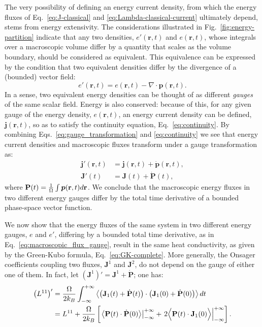 The very possibility of defining an energy current density, from which the energy fluxes of Eq.~\eqref{eq:J-classical} and \eqref{eq:Lambda-classical-current} ultimately depend, stems from energy extensivity. The considerations illustrated in Fig.~\ref{fig:energy-partition} indicate that any two densities, $e'(\mathbf{r},t)$ and $e(\mathbf{r},t)$, whose integrals over a macroscopic volume differ by a quantity that scales as the volume boundary, should be considered as equivalent. This equivalence can be expressed by the condition that two equivalent densities differ by the divergence of a (bounded) vector field:
\begin{equation}
  e'(\mathbf{r},t)=e(\mathbf{r},t) - \nabla\cdot \bm{p}(\mathbf{r},t). \label{eq:gauge_transformation}
\end{equation}
In a sense, two equivalent energy densities can be thought of as different \emph{gauges} of the same scalar field. Energy is also conserved: because of this, for any given gauge of the energy density, $e(\mathbf{r},t)$, an energy current density can be defined, $\bm{j}(\mathbf{r},t)$, so as to satisfy the continuity equation, Eq.~\eqref{eq:continuity}. By combining Eqs.~\eqref{eq:gauge_transformation} and \eqref{eq:continuity} we see that energy current densities and macroscopic fluxes transform under a gauge transformation as:
\begin{align}
 \bm{j}'(\mathbf{r},t) & = \bm{j}(\mathbf{r},t) + \dot{\bm{p}}(\mathbf{r},t), \label{eq:current_density_gauge} \\
  \mathbf{J}'(t) & = \mathbf{J}(t) + \dot{\mathbf{P}}(t), \label{eq:macroscopic_flux_gauge}
\end{align}
where $\mathbf{P}(t)=\frac{1}{{\mathrm\Omega}} \int\bm{p}(\mathbf{r},t)d\mathbf{r}$. We
conclude that the macroscopic energy fluxes in two different energy gauges differ by the total time derivative of a bounded phase-space vector function.

We now show that the energy fluxes of the same system in two different energy gauges, $e$ and $e'$, differing by a bounded total time derivative, as in Eq.~\eqref{eq:macroscopic_flux_gauge}, result in the same heat conductivity, as given by the Green-Kubo formula, Eq.~\eqref{eq:GK-complete}. More generally, the Onsager coefficients coupling two fluxes, $\mathbf{J}^1$ and $\mathbf{J}^2$, do not depend on the gauge of either one of them. In fact, let $\left(\mathbf{J}^1\right)' = \mathbf{J}^1 + \dot{\mathbf{P}}$; one has:
\begin{equation}
  \begin{aligned}
    \left (L^{11} \right)' &= \frac{\rOmega}{2 k_B }\int_{-\infty}^{+\infty} \left \langle \left (\mathbf{J}_1(t)+\dot{\mathbf{P}}(t) \right ) \cdot  \left (\mathbf{J}_1(0)+\dot{\mathbf{P}}(0)\right ) \right \rangle dt \\
    &= L^{11} + \frac{\rOmega}{2 k_B } \left[ \left .  \left \langle \mathbf{P}(t) \cdot \dot{\mathbf{P}}(0) \right \rangle \right |^{+\infty}_{-\infty} + \left .  2 \Bigl \langle \mathbf{P}(t) \cdot \mathbf{J}_1(0) \Bigr \rangle \right |^{+\infty}_{-\infty} \right] .
  \end{aligned} \label{eq:L=L'}
\end{equation}

